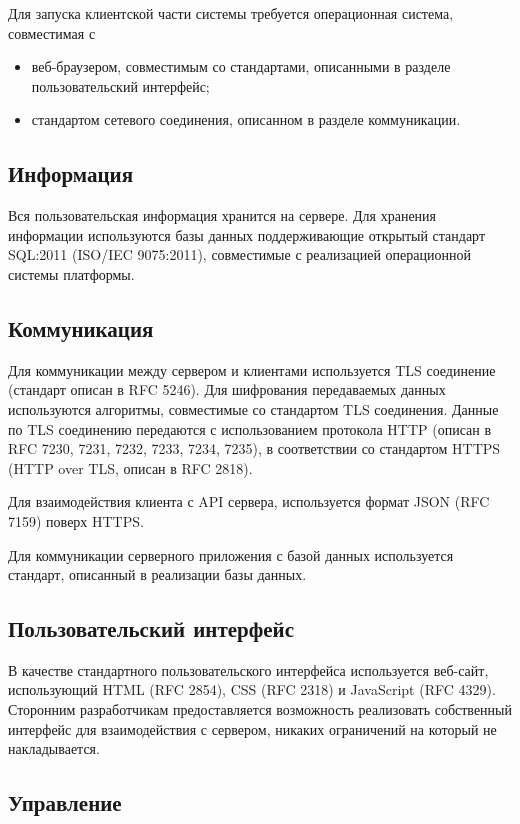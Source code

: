 \documentclass[10pt]{article}
\begin{document}
Для запуска клиентской части системы требуется операционная система, совместимая с
\begin{itemize}
  \item веб-браузером, совместимым со стандартами, описанными в разделе пользовательский интерфейс;
  \item стандартом сетевого соединения, описанном в разделе коммуникации.
\end{itemize}

\subsection{Информация}

Вся пользовательская информация хранится на сервере.
Для хранения информации используются базы данных поддерживающие открытый стандарт SQL:2011 (ISO/IEC 9075:2011), совместимые с реализацией операционной системы платформы.

\subsection{Коммуникация}

Для коммуникации между сервером и клиентами используется TLS соединение (стандарт описан в RFC 5246).
Для шифрования передаваемых данных используются алгоритмы, совместимые со стандартом TLS соединения.
Данные по TLS соединению передаются с использованием протокола HTTP (описан в RFC 7230, 7231, 7232, 7233, 7234, 7235), в соответствии со стандартом HTTPS (HTTP over TLS, описан в RFC 2818).

Для взаимодействия клиента с API сервера, используется формат JSON (RFC 7159) поверх HTTPS.

Для коммуникации серверного приложения с базой данных используется стандарт, описанный в реализации базы данных.

\subsection{Пользовательский интерфейс}

В качестве стандартного пользовательского интерфейса используется веб-сайт, использующий HTML (RFC 2854), CSS (RFC 2318) и JavaScript (RFC 4329).
Сторонним разработчикам предоставляется возможность реализовать собственный интерфейс для взаимодействия с сервером, никаких ограничений на который не накладывается.

\subsection{Управление}
\end{document}
